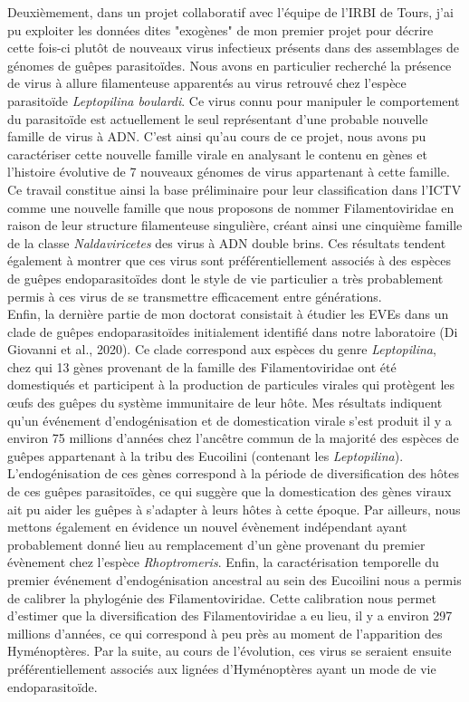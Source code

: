 Deuxièmement, dans un projet collaboratif avec l'équipe de l'IRBI de Tours, j'ai pu exploiter les données dites "exogènes" de mon premier projet pour décrire cette fois-ci plutôt de nouveaux virus infectieux présents dans des assemblages de génomes de guêpes parasitoïdes. Nous avons en particulier recherché la présence de virus à allure filamenteuse apparentés au virus retrouvé chez l'espèce parasitoïde \textit{Leptopilina boulardi}. Ce virus connu pour manipuler le comportement du parasitoïde est actuellement le seul représentant d’une probable nouvelle famille de virus à ADN. C'est ainsi qu'au cours de ce projet, nous avons pu caractériser cette nouvelle famille virale en analysant le contenu en gènes et l’histoire évolutive de 7 nouveaux génomes de virus appartenant à cette famille. Ce travail constitue ainsi la base préliminaire pour leur classification dans l'ICTV comme une nouvelle famille que nous proposons de nommer Filamentoviridae en raison de leur structure filamenteuse singulière, créant ainsi une cinquième famille de la classe \textit{Naldaviricetes} des virus à ADN double brins. Ces résultats tendent également à montrer que ces virus sont préférentiellement associés à des espèces de guêpes endoparasitoïdes dont le style de vie particulier a très probablement permis à ces virus de se transmettre efficacement entre générations.\\
 
Enfin, la dernière partie de mon doctorat consistait à étudier les EVEs dans un clade de guêpes endoparasitoïdes initialement identifié dans notre laboratoire (Di Giovanni et al., 2020). Ce clade correspond aux espèces du genre \textit{Leptopilina}, chez qui 13 gènes provenant de la famille des Filamentoviridae ont été domestiqués et participent à la production de particules virales qui protègent les œufs des guêpes du système immunitaire de leur hôte. Mes résultats indiquent qu'un événement d'endogénisation et de domestication virale s'est produit il y a environ 75 millions d'années chez l'ancêtre commun de la majorité des espèces de guêpes appartenant à la tribu des Eucoilini (contenant les \textit{Leptopilina}). L'endogénisation de ces gènes correspond à la période de diversification des hôtes de ces guêpes parasitoïdes, ce qui suggère que la domestication des gènes viraux ait pu aider les guêpes à s'adapter à leurs hôtes à cette époque. Par ailleurs, nous mettons également en évidence un nouvel évènement indépendant ayant probablement donné lieu au remplacement d'un gène provenant du premier évènement chez l'espèce \textit{Rhoptromeris}. Enfin, la caractérisation temporelle du premier événement d'endogénisation ancestral au sein des Eucoilini nous a permis de calibrer la phylogénie des Filamentoviridae. Cette calibration nous permet d'estimer que la diversification des Filamentoviridae a eu lieu, il y a environ 297 millions d'années, ce qui correspond à peu près au moment de l'apparition des Hyménoptères. Par la suite, au cours de l'évolution, ces virus se seraient ensuite préférentiellement associés aux lignées d'Hyménoptères ayant un mode de vie endoparasitoïde.\\ 

